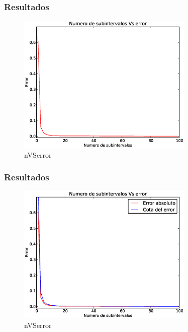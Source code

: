 \documentclass{beamer}
\begin{document}
\begin{frame}
  \frametitle{Resultados}
  \begin{figure}[!th]
    \begin{center}
      \includegraphics[width=0.75\textwidth]{img/Plot_nVSerror.eps}
      \caption{nVSerror}
      \label{fig:1}
    \end{center}
  \end{figure}
\end{frame}

\begin{frame}
  \frametitle{Resultados}
  \begin{figure}[!th]
    \begin{center}
      \includegraphics[width=0.75\textwidth]{img/Plot_nVSerrorAndcota.eps}
      \caption{nVSerror}
      \label{fig:1}
    \end{center}
  \end{figure}
\end{frame}
\end{document}
